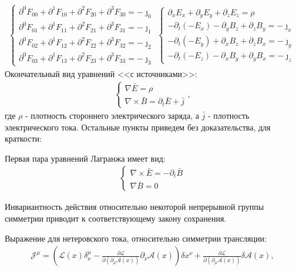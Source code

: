 \documentclass[__main__.tex]{subfiles}
\begin{document}
\begin{gather}
\begin{cases}
\partial^0F_{00}+\partial^1F_{10}+\partial^2F_{20}+\partial^3F_{30}=-\jmath_0 \\
\partial^0F_{01}+\partial^1F_{11}+\partial^2F_{21}+\partial^3F_{31}=-\jmath_1 \\
\partial^0F_{02}+\partial^1F_{12}+\partial^2F_{22}+\partial^3F_{32}=-\jmath_2 \\
\partial^0F_{03}+\partial^1F_{13}+\partial^2F_{23}+\partial^3F_{33}=-\jmath_3
\end{cases}
\begin{cases}
\partial_xE_x+\partial_yE_y+\partial_zE_z=\rho          \\
-\partial_t(-E_x)-\partial_yB_z+\partial_zB_y=-\jmath_x \\
-\partial_t(-E_y)+\partial_xB_z+\partial_zB_x=-\jmath_y \\
-\partial_t(-E_z)-\partial_xB_y+\partial_yB_x=-\jmath_z
\end{cases}
\end{gather}
Окончательный вид уравнений <<с источниками>>:\\
\begin{gather}
\begin{cases}
\nabla\bar{E}=\rho \\
\nabla\times\bar{B}=\partial_t\bar{E}+\bar{j}
\end{cases},
\end{gather}
где $\rho$ - плотность стороннего электрического заряда, а $\bar{j}$ - плотность электрического тока. Остальные пункты приведем без доказательства, для краткости:

Первая пара уравнений Лагранжа имеет вид:
\begin{gather}
\begin{cases}
\nabla\times\bar{E}=-\partial_t\bar{B} \\
\nabla\bar{B}=0
\end{cases}
\end{gather}

\begin{theorem}[Нётер]
	Инвариантность действия относительно некоторой непрерывной группы симметрии приводит к соответствующему закону сохранения.
\end{theorem}

Выражение для нетеровского тока, относительно симметрии трансляции:
\begin{gather}
\mathcal{J}^\mu=\left(\mathcal{L}(x)\delta_\nu^\mu-\frac{\partial \mathcal{L}}{\partial (\partial_\mu\mathcal{A}(x))}\partial_\nu\mathcal{A}(x)\right)\delta x^\nu+\frac{\partial\mathcal{L}}{\partial(\partial_\mu\mathcal{A}(x))}\delta\mathcal{A}(x),
\end{gather}
\end{document}

